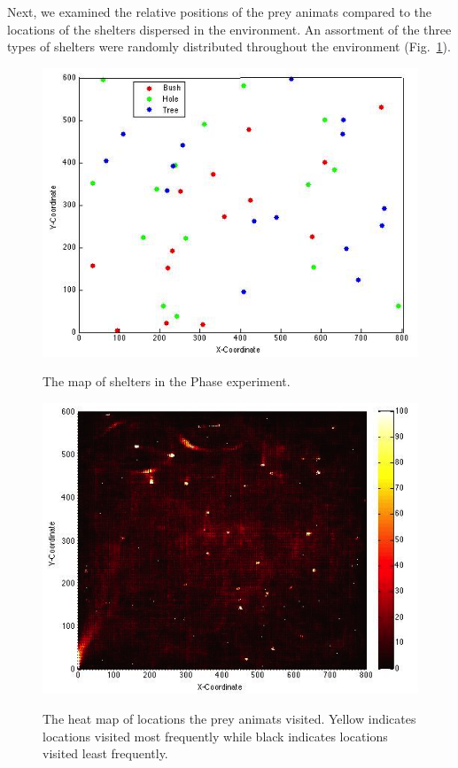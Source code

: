 \documentclass[10pt,conference,letterpaper,doublecolumn]{IEEEtran}
\begin{document}
 Next, we examined the relative positions of the prey animats compared to the locations of the shelters dispersed in the environment. An assortment of the three types of shelters were randomly distributed throughout the environment (Fig.~\ref{map}).
\begin{figure}[H]
  \centering
  \includegraphics[scale=0.4]{map.png} \\
  \caption{The map of shelters in the Phase \uppercase\expandafter{} experiment.}
  \label{map}
\end{figure}
\begin{figure}[H]
  \centering
  \includegraphics[scale=0.45]{map_rate.png} \\
  \caption{The heat map of locations the prey animats visited. Yellow indicates locations visited most frequently while black indicates locations visited least frequently.}
  \label{mapr}
\end{figure}
\end{document}
